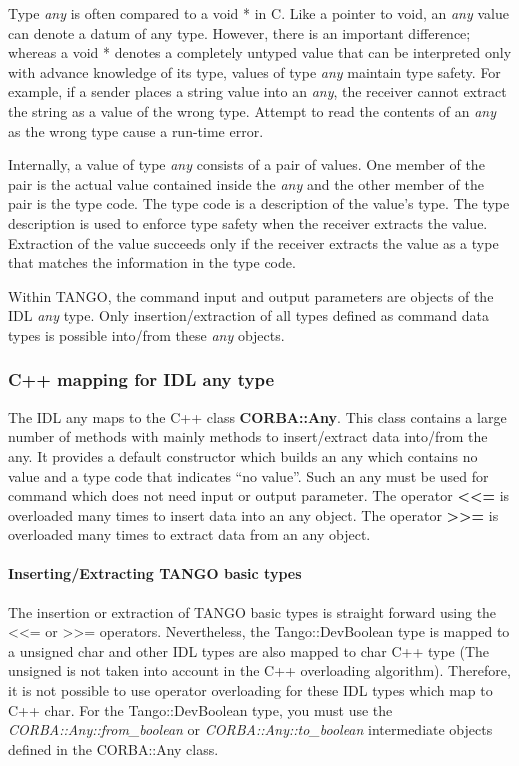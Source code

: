 Type \emph{any} is often compared to a void {*} in C. Like a pointer
to void, an \emph{any} value can denote a datum of any type. However,
there is an important difference; whereas a void {*} denotes a completely
untyped value that can be interpreted only with advance knowledge
of its type, values of type \emph{any} maintain type safety. For example,
if a sender places a string value into an \emph{any}, the receiver
cannot extract the string as a value of the wrong type. Attempt to
read the contents of an \emph{any} as the wrong type cause a run-time
error.

Internally, a value of type \emph{any} consists of a pair of values.
One member of the pair is the actual value contained inside the \emph{any}
and the other member of the pair is the type code. The type code is
a description of the value's type. The type description is used to
enforce type safety when the receiver extracts the value. Extraction
of the value succeeds only if the receiver extracts the value as a
type that matches the information in the type code.

Within TANGO, the command input and output parameters are objects
of the IDL \emph{any} type. Only insertion/extraction of all types
defined as command data types is possible into/from these \emph{any}
objects.

\subsubsection{C++ mapping for IDL any type}

The IDL any maps to the C++ class \textbf{CORBA::Any}.
This class contains a large number of methods with mainly methods
to insert/extract data into/from the any. It provides a default constructor
which builds an any which contains no value and a type code that indicates
``no value''. Such an any must be used for command which does not
need input or output parameter. The operator \textbf{<\textcompwordmark{}<=}
is overloaded many times to insert data into an any object. The operator
\textbf{>\textcompwordmark{}>=} is overloaded many times to extract
data from an any object.

\paragraph{Inserting/Extracting TANGO basic types}

The insertion or extraction of TANGO basic types is straight forward
using the <\textcompwordmark{}<= or >\textcompwordmark{}>= operators.
Nevertheless, the Tango::DevBoolean type is mapped to a unsigned char
and other IDL types are also mapped to char C++ type (The unsigned
is not taken into account in the C++ overloading algorithm). Therefore,
it is not possible to use operator overloading for these IDL types
which map to C++ char. For the Tango::DevBoolean type, you must use
the \emph{CORBA::Any::from\_boolean} or \emph{CORBA::Any::to\_boolean}
intermediate objects defined in the CORBA::Any class.

